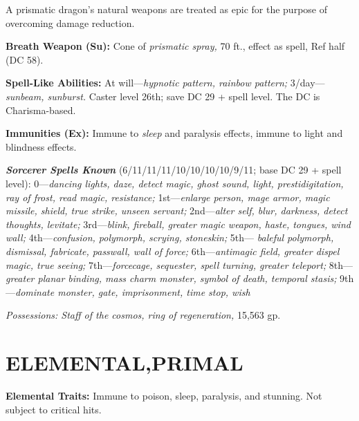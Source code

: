 \documentclass{article}
\begin{document}
A prismatic dragon's natural weapons are treated as epic for the purpose of overcoming 
damage reduction.

\textbf{Breath Weapon (Su):} Cone of \textit{prismatic spray, }70 ft., effect as 
spell, Ref half (DC 58). 

\textbf{Spell-Like Abilities:} At will---\textit{hypnotic pattern, rainbow pattern; 
}3/day---\textit{sunbeam, sunburst. }Caster level 26th; save DC 29 + spell level. 
The DC is Charisma-based.

\textbf{Immunities (Ex):} Immune to \textit{sleep }and paralysis effects, immune 
to light and blindness effects. 

\textit{\textbf{Sorcerer Spells Known}}\textit{ }(6/11/11/11/10/10/10/10/9/11; 
base DC 29 + spell level): 0---\textit{dancing lights, daze, detect magic, ghost 
sound, light, prestidigitation, ray of frost, read magic, resistance; }1st---\textit{enlarge 
person, mage armor, magic missile, shield, true strike, unseen servant; }2nd---\textit{alter 
self, blur, darkness, detect thoughts, levitate; }3rd---\textit{blink, fireball, 
greater magic weapon, haste, tongues, wind wall; }4th---\textit{confusion, polymorph, 
scrying, stoneskin; }5th---\textit{ baleful polymorph, dismissal, fabricate, passwall, 
wall of force; }6th---\textit{antimagic field, greater dispel magic, true seeing; 
}7th---\textit{forcecage, sequester, spell turning, greater teleport; }8th---\textit{greater 
planar binding, mass charm monster, symbol of death, temporal stasis; }9th---\textit{dominate 
monster, gate, imprisonment, time stop, wish }

\textit{Possessions: Staff of the cosmos, ring of regeneration, }15,563 gp. 

\vspace{12pt}
\section*{{\LARGE{}ELEMENTAL,PRIMAL }}

\textbf{Elemental Traits:} Immune to poison, sleep, paralysis, and stunning. Not 
subject to critical hits.
\end{document}
